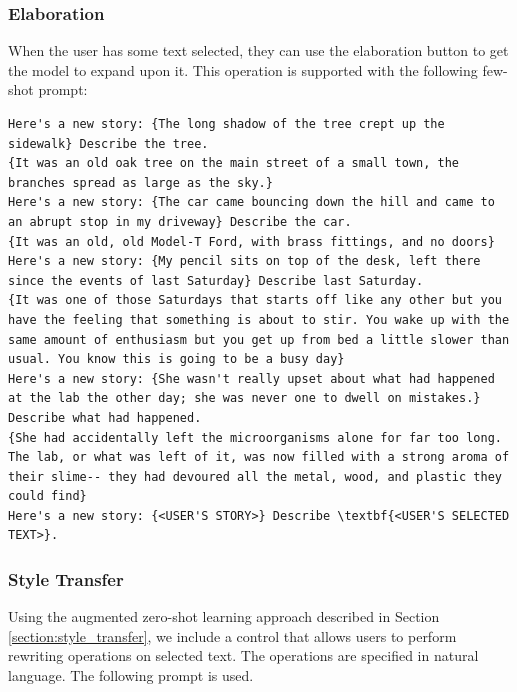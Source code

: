 \subsubsection{Elaboration}
When the user has some text selected, they can use the elaboration button to get the model to expand upon it.
This operation is supported with the following few-shot prompt:

\begin{verbatim}
Here's a new story: {The long shadow of the tree crept up the sidewalk} Describe the tree.
{It was an old oak tree on the main street of a small town, the branches spread as large as the sky.}
Here's a new story: {The car came bouncing down the hill and came to an abrupt stop in my driveway} Describe the car.
{It was an old, old Model-T Ford, with brass fittings, and no doors}
Here's a new story: {My pencil sits on top of the desk, left there since ‌the events‌ of last Saturday} Describe last Saturday.
{It was one of those Saturdays that starts off like any other but you have the feeling that something is about to stir. You wake up with the same amount of enthusiasm but you get up from bed a little slower than usual. You know this is going to be a busy day}
Here's a new story: {She wasn't really upset about what had happened at the lab the other day; she was never one to dwell on mistakes.} Describe what had happened.
{She had accidentally left the microorganisms alone for far too long. The lab, or what was left of it, was now filled with a strong aroma of their slime-- they had devoured all the metal, wood, and plastic they could find}
Here's a new story: {<USER'S STORY>} Describe \textbf{<USER'S SELECTED TEXT>}.
\end{verbatim}

\subsubsection{Style Transfer}
Using the augmented zero-shot learning approach described in Section \ref{section:style_transfer}, we include a control that allows users to perform rewriting operations on selected text. The operations are specified in natural language.
The following prompt is used.

